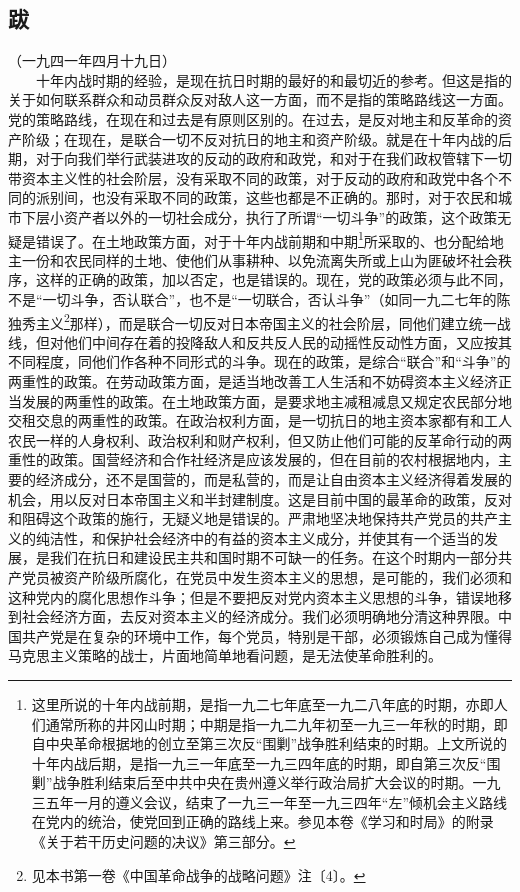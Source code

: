 \documentclass[cn,11pt,chinese]{elegantbook}
\def\myformat#1{\hfil\hfil #1}
\begin{document}
\subsection*{\myformat{跋}}
（一九四一年四月十九日）\\
　　十年内战时期的经验，是现在抗日时期的最好的和最切近的参考。但这是指的关于如何联系群众和动员群众反对敌人这一方面，而不是指的策略路线这一方面。党的策略路线，在现在和过去是有原则区别的。在过去，是反对地主和反革命的资产阶级；在现在，是联合一切不反对抗日的地主和资产阶级。就是在十年内战的后期，对于向我们举行武装进攻的反动的政府和政党，和对于在我们政权管辖下一切带资本主义性的社会阶层，没有采取不同的政策，对于反动的政府和政党中各个不同的派别间，也没有采取不同的政策，这些也都是不正确的。那时，对于农民和城市下层小资产者以外的一切社会成分，执行了所谓“一切斗争”的政策，这个政策无疑是错误了。在土地政策方面，对于十年内战前期和中期\footnote[5]{ 这里所说的十年内战前期，是指一九二七年底至一九二八年底的时期，亦即人们通常所称的井冈山时期；中期是指一九二九年初至一九三一年秋的时期，即自中央革命根据地的创立至第三次反“围剿”战争胜利结束的时期。上文所说的十年内战后期，是指一九三一年底至一九三四年底的时期，即自第三次反“围剿”战争胜利结束后至中共中央在贵州遵义举行政治局扩大会议的时期。一九三五年一月的遵义会议，结束了一九三一年至一九三四年“左”倾机会主义路线在党内的统治，使党回到正确的路线上来。参见本卷《学习和时局》的附录《关于若干历史问题的决议》第三部分。}所采取的、也分配给地主一份和农民同样的土地、使他们从事耕种、以免流离失所或上山为匪破坏社会秩序，这样的正确的政策，加以否定，也是错误的。现在，党的政策必须与此不同，不是“一切斗争，否认联合”，也不是“一切联合，否认斗争”（如同一九二七年的陈独秀主义\footnote[6]{ 见本书第一卷《中国革命战争的战略问题》注〔4〕。}那样），而是联合一切反对日本帝国主义的社会阶层，同他们建立统一战线，但对他们中间存在着的投降敌人和反共反人民的动摇性反动性方面，又应按其不同程度，同他们作各种不同形式的斗争。现在的政策，是综合“联合”和“斗争”的两重性的政策。在劳动政策方面，是适当地改善工人生活和不妨碍资本主义经济正当发展的两重性的政策。在土地政策方面，是要求地主减租减息又规定农民部分地交租交息的两重性的政策。在政治权利方面，是一切抗日的地主资本家都有和工人农民一样的人身权利、政治权利和财产权利，但又防止他们可能的反革命行动的两重性的政策。国营经济和合作社经济是应该发展的，但在目前的农村根据地内，主要的经济成分，还不是国营的，而是私营的，而是让自由资本主义经济得着发展的机会，用以反对日本帝国主义和半封建制度。这是目前中国的最革命的政策，反对和阻碍这个政策的施行，无疑义地是错误的。严肃地坚决地保持共产党员的共产主义的纯洁性，和保护社会经济中的有益的资本主义成分，并使其有一个适当的发展，是我们在抗日和建设民主共和国时期不可缺一的任务。在这个时期内一部分共产党员被资产阶级所腐化，在党员中发生资本主义的思想，是可能的，我们必须和这种党内的腐化思想作斗争；但是不要把反对党内资本主义思想的斗争，错误地移到社会经济方面，去反对资本主义的经济成分。我们必须明确地分清这种界限。中国共产党是在复杂的环境中工作，每个党员，特别是干部，必须锻炼自己成为懂得马克思主义策略的战士，片面地简单地看问题，是无法使革命胜利的。\\
\end{document}
